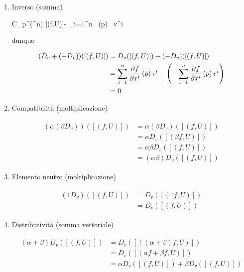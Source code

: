 \begin{enumerate}
	\item Inverso (somma)
	
			{C_{p}^{\infty}(\R^{n})}{\R}
			{[(f,U)]}{- \sum_{i=1}^{n}  \, (p) \, v^{i}}
			
		dunque
	
		\begin{align}
			\begin{split}
				(D_{v} + (- D_{v})) ([(f,U)]) &= D_{v} ([(f,U)]) + (- D_{v}) ([(f,U)])\\
				&= \sum_{i=1}^{n} \pdv{f}{x^{i}} \, (p) \, v^{i} + \left( - \sum_{i=1}^{n} \pdv{f}{x^{i}} \, (p) \, v^{i} \right)\\
				&= 0
			\end{split}
		\end{align}
	
	\item Compatibilità (moltiplicazione)
	
		\begin{align}
			\begin{split}
				(\alpha (\beta D_{v})) ([(f,U)]) &= \alpha (\beta D_{v}) ([(f,U)])\\
				&= \alpha D_{v} ([(\beta f,U)])\\
				&= \alpha \beta D_{v} ([(f,U)])\\
				&= (\alpha \beta) D_{v} ([(f,U)])
			\end{split}
		\end{align}
	
	\item Elemento neutro (moltiplicazione)
	
		\begin{align}
			\begin{split}
				(1 D_{v}) ([(f,U)]) &= D_{v} ([(1 f,U)])\\
				&= D_{v} ([(f,U)])
			\end{split}
		\end{align}
	
	\item Distributività (somma vettoriale)
	
		\begin{align}
			\begin{split}
				(\alpha + \beta) D_{v} ([(f,U)]) &= D_{v} ([((\alpha + \beta) f,U)])\\
				&= D_{v} ([(\alpha f + \beta f,U)])\\
				&= \alpha D_{v} ([(f,U)]) + \beta D_{v} ([(f,U)])\\
			\end{split}
		\end{align}
	

\end{enumerate}
